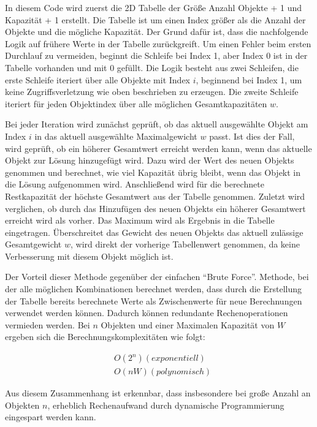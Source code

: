 In diesem Code wird zuerst die 2D Tabelle der Größe Anzahl Objekte + 1 und Kapazität + 1 erstellt. Die Tabelle ist um einen Index größer als die Anzahl der Objekte und die mögliche Kapazität. Der Grund dafür ist, dass die nachfolgende Logik auf frühere Werte in der Tabelle zurückgreift. Um einen Fehler beim ersten Durchlauf zu vermeiden, beginnt die Schleife bei Index 1, aber Index 0 ist in der Tabelle vorhanden und mit 0 gefüllt. Die Logik besteht aus zwei Schleifen, die erste Schleife iteriert über alle Objekte mit Index $i$, beginnend bei Index 1, um keine Zugriffsverletzung wie oben beschrieben zu erzeugen. Die zweite Schleife iteriert für jeden Objektindex über alle möglichen Gesamtkapazitäten $ w $. 

Bei jeder Iteration wird zunächst geprüft, ob das aktuell ausgewählte Objekt am Index $ i $ in das aktuell ausgewählte Maximalgewicht $ w $ passt. Ist dies der Fall, wird geprüft, ob ein höherer Gesamtwert erreicht werden kann, wenn das aktuelle Objekt zur Lösung hinzugefügt wird. Dazu wird der Wert des neuen Objekts genommen und berechnet, wie viel Kapazität übrig bleibt, wenn das Objekt in die Lösung aufgenommen wird. Anschließend wird für die berechnete Restkapazität der höchste Gesamtwert aus der Tabelle genommen. Zuletzt wird verglichen, ob durch das Hinzufügen des neuen Objekts ein höherer Gesamtwert erreicht wird als vorher. Das Maximum wird als Ergebnis in die Tabelle eingetragen. Überschreitet das Gewicht des neuen Objekts das aktuell zulässige Gesamtgewicht $ w $, wird direkt der vorherige Tabellenwert genommen, da keine Verbesserung mit diesem Objekt möglich ist.

Der Vorteil dieser Methode gegenüber der einfachen \enquote{Brute Force}. Methode, bei der alle möglichen Kombinationen berechnet werden, dass durch die Erstellung der Tabelle bereits berechnete Werte als Zwischenwerte für neue Berechnungen verwendet werden können. Dadurch können redundante Rechenoperationen vermieden werden. Bei $ n $ Objekten und einer Maximalen Kapazität von $ W $ ergeben sich die Berechnungskomplexitäten wie folgt: 

\begin{align}
    & O(2^n) (exponentiell) \\
    & O(nW) (polynomisch)
\end{align}

Aus diesem Zusammenhang ist erkennbar, dass insbesondere bei große Anzahl an Objekten $ n $, erheblich Rechenaufwand durch dynamische Programmierung eingespart werden kann. 

